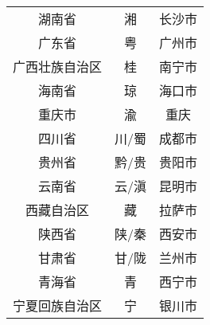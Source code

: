 \begin{longtable}{ccc}
	湖南省         & 湘   & 长沙市                                                                                                                                  \\
	广东省         & 粤   & 广州市                                                                                                                                  \\
	广西壮族自治区     & 桂   & 南宁市                                                                                                                                  \\
	海南省         & 琼   & 海口市                                                                                                                                  \\
	重庆市         & 渝   & 重庆                                                                                                                                   \\
	四川省         & 川/蜀 & 成都市                                                                                                                                  \\
	贵州省         & 黔/贵 & 贵阳市                                                                                                                                  \\
	云南省         & 云/滇 & 昆明市                                                                                                                                  \\
	西藏自治区       & 藏   & 拉萨市                                                                                                                                  \\
	陕西省         & 陕/秦 & 西安市                                                                                                                                  \\
	甘肃省         & 甘/陇 & 兰州市                                                                                                                                  \\
	青海省         & 青   & 西宁市                                                                                                                                  \\
	宁夏回族自治区     & 宁   & 银川市                                                                                                                                  \\

\end{longtable}
